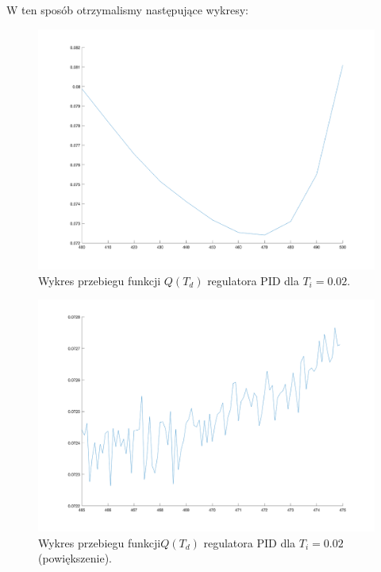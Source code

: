 \documentclass[a4paper,10pt]{article}
\begin{document}
\newpage
W ten sposób otrzymalismy następujące wykresy: \\
\begin{figure}[!h]
    \centering
	\includegraphics[width=130mm]{PID-opt-ti-02.png}
	\caption{Wykres przebiegu funkcji $Q(T_{d})$ regulatora PID dla $T_{i}=0.02$.}
    \label{fig:regulatorPIDti15opt1}
\end{figure}
\begin{figure}[!h]
    \centering
	\includegraphics[width=130mm]{PID-opt-ti-02-zoom.png}
	\caption{Wykres przebiegu funkcji$Q(T_{d})$ regulatora PID dla $T_{i}=0.02$ (powiększenie).}
    \label{fig:regulatorPIDti15opt2}
\end{figure}
\newpage
\end{document}

